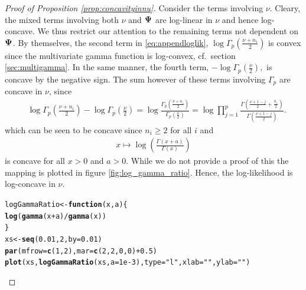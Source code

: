 \documentclass{article}\usepackage[]{graphicx}\usepackage[]{color}
\makeatletter
\newcommand{\hlnum}[1]{\textcolor[rgb]{0.686,0.059,0.569}{#1}}%
\newcommand{\hlstr}[1]{\textcolor[rgb]{0.192,0.494,0.8}{#1}}%
\newcommand{\hlopt}[1]{\textcolor[rgb]{0,0,0}{#1}}%
\newcommand{\hlstd}[1]{\textcolor[rgb]{0.345,0.345,0.345}{#1}}%
\newcommand{\hlkwa}[1]{\textcolor[rgb]{0.161,0.373,0.58}{\textbf{#1}}}%
\newcommand{\hlkwb}[1]{\textcolor[rgb]{0.69,0.353,0.396}{#1}}%
\newcommand{\hlkwc}[1]{\textcolor[rgb]{0.333,0.667,0.333}{#1}}%
\newcommand{\hlkwd}[1]{\textcolor[rgb]{0.737,0.353,0.396}{\textbf{#1}}}%
\newenvironment{kframe}{%
 \def\at@end@of@kframe{}%
 \ifinner\ifhmode%
  \def\at@end@of@kframe{\end{minipage}}%
  \begin{minipage}{\columnwidth}%
 \fi\fi%
 \def\FrameCommand##1{\hskip\@totalleftmargin \hskip-\fboxsep
 \colorbox{shadecolor}{##1}\hskip-\fboxsep
     \hskip-\linewidth \hskip-\@totalleftmargin \hskip\columnwidth}%
 \MakeFramed {\advance\hsize-\width
   \@totalleftmargin\z@ \linewidth\hsize
   \@setminipage}}%
 {\par\unskip\endMakeFramed%
 \at@end@of@kframe}
\newenvironment{knitrout}{}{} %
\makeatother
\begin{document}
\begin{proof}[Proof of Proposition \ref{prop:concavityinnu}]
Consider the terms involving $\nu$.
Cleary, the mixed terms involving both $\nu$ and ${\boldsymbol{\Psi}}$ are log-linear in $\nu$ and hence log-concave.
We thus restrict our attention to the remaining terms not dependent on ${\boldsymbol{\Psi}}$.
By themselves, the second term in \eqref{eq:appendloglik},
$
\log \Gamma_p\!\left(\frac{\nu + n_i}{2}\right)
$
is convex since the multivariate gamma function is log-convex, cf.\ section \ref{sec:multigamma}.
In the same manner, the fourth term,
$
  - \log \Gamma_p\!\left(\frac{\nu}{2}\right),
$
is concave by the negative sign.
The sum however of these terms involving $\Gamma_p$ are concave in $\nu$, since
\begin{align*}
  &\log\Gamma_p\!\left( \frac{\nu + n_i}{2} \right) -
    \log\Gamma_p\!\left( \frac{\nu}{2} \right)
  =  \log\frac{\Gamma_p\!\left( \frac{\nu + n_i}{2} \right)}{
                \Gamma_p\!\left( \frac{\nu}{2}       \right)}
  = \log \prod_{j = 1}^p
    \frac{\Gamma\!\left( \frac{\nu + 1 - j}{2} + \frac{n_i}{2} \right)}{
          \Gamma\!\left( \frac{\nu + 1 - j}{2} \right)}.
\end{align*}
which can be seen to be concave since $n_i \geq 2$ for all $i$ and
\begin{align}
  x \mapsto \log\left(\frac{\Gamma(x + a)}{\Gamma(x)}\right)
  \label{eq:logGammaRatio}
\end{align}
is concave for all $x>0$ and $a > 0$. While we do not provide a proof of this the mapping is plotted in figure \ref{fig:log_gamma_ratio}.
Hence, the log-likelihood is log-concave in $\nu$.
\begin{knitrout}\footnotesize
{}\color{fgcolor}\begin{kframe}
\begin{alltt}
\hlstd{logGammaRatio} \hlkwb{<-} \hlkwa{function}\hlstd{(}\hlkwc{x}\hlstd{,} \hlkwc{a}\hlstd{) \{}
  \hlkwd{log}\hlstd{(}\hlkwd{gamma}\hlstd{(x} \hlopt{+} \hlstd{a)}\hlopt{/}\hlkwd{gamma}\hlstd{(x))}
\hlstd{\}}
\hlstd{xs} \hlkwb{<-} \hlkwd{seq}\hlstd{(}\hlnum{0.01}\hlstd{,} \hlnum{2}\hlstd{,} \hlkwc{by} \hlstd{=} \hlnum{0.01}\hlstd{)}
\hlkwd{par}\hlstd{(}\hlkwc{mfrow} \hlstd{=} \hlkwd{c}\hlstd{(}\hlnum{1}\hlstd{,}\hlnum{2}\hlstd{),} \hlkwc{mar} \hlstd{=} \hlkwd{c}\hlstd{(}\hlnum{2}\hlstd{,}\hlnum{2}\hlstd{,}\hlnum{0}\hlstd{,}\hlnum{0}\hlstd{)}\hlopt{+} \hlnum{0.5}\hlstd{)}
\hlkwd{plot}\hlstd{(xs,} \hlkwd{logGammaRatio}\hlstd{(xs,} \hlkwc{a} \hlstd{=} \hlnum{1e-3}\hlstd{),} \hlkwc{type} \hlstd{=} \hlstr{"l"}\hlstd{,} \hlkwc{xlab} \hlstd{=} \hlstr{""}\hlstd{,} \hlkwc{ylab} \hlstd{=} \hlstr{""}\hlstd{)}
\end{alltt}
\end{kframe}\begin{figure}[ht]


\end{figure}
\end{knitrout}
\end{proof}
\end{document}
